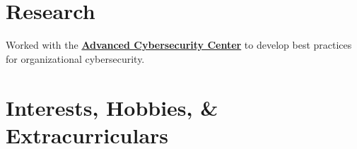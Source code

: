 \documentclass[letterpaper]{deedy-resume} %
\begin{document}
\begin{minipage}[t]{0.66\textwidth}
\sectionspace %






\section{Research}


Worked with the \textbf{\href{http://www.acscenter.org/}{Advanced Cybersecurity Center}} to develop best practices for organizational cybersecurity.

\sectionspace %






\section{Interests, Hobbies, \& Extracurriculars}


\end{minipage}
\end{document}
